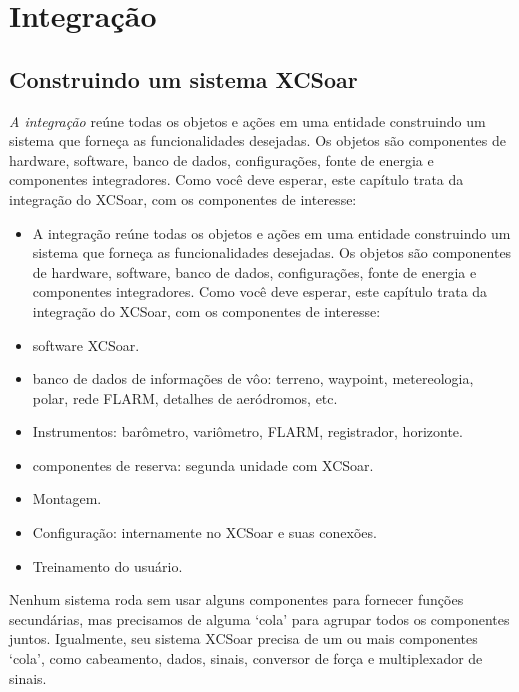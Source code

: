 \chapter{Integração}\label{cha:Integration}

\section{Construindo um sistema XCSoar }
\emph{A integração} reúne todas os objetos e ações em uma entidade construindo um sistema que forneça as funcionalidades desejadas.  Os objetos são componentes de hardware, software, banco de dados, configurações, fonte de energia e componentes integradores.  Como você deve esperar, este capítulo trata da integração do XCSoar, com os componentes de interesse:
\begin{itemize} 
\item A integração reúne todas os objetos e ações em uma entidade construindo um sistema que forneça as funcionalidades desejadas.  Os objetos são componentes de hardware, software, banco de dados, configurações, fonte de energia e componentes integradores.  Como você deve esperar, este capítulo trata da integração do XCSoar, com os componentes de interesse:
\item software XCSoar. 
\item banco de dados de informações de vôo: terreno, waypoint, metereologia, polar, rede FLARM, detalhes de aeródromos, etc.
\item Instrumentos: barômetro, variômetro, FLARM, registrador, horizonte.
\item componentes de reserva: segunda unidade com XCSoar.
\item Montagem.
\item Configuração: internamente no XCSoar e suas conexões.
\item Treinamento do usuário.
\end{itemize}
Nenhum sistema roda sem usar alguns componentes para fornecer funções secundárias, mas precisamos de alguma ‘cola’ para agrupar todos os componentes juntos.  Igualmente, seu sistema XCSoar precisa de um ou mais componentes ‘cola’, como cabeamento, dados, sinais, conversor de força e multiplexador de sinais.

